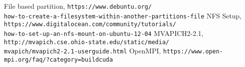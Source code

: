 \documentclass[10pt]{article}
\begin{document}
\begin{thebibliography}{9}
 File based partition, \texttt{https://www.debuntu.org/\\how-to-create-a-filesystem-within-another-partitions-file}
 NFS Setup, \texttt{https://www.digitalocean.com/community/tutorials/\\how-to-set-up-an-nfs-mount-on-ubuntu-12-04}
 MVAPICH2-2.1, \texttt{http://mvapich.cse.ohio-state.edu/static/media/\\mvapich/mvapich2-2.1-userguide.html}
 OpenMPI, \texttt{https://www.open-mpi.org/faq/?category=buildcuda}
\end{thebibliography}
\end{document}

